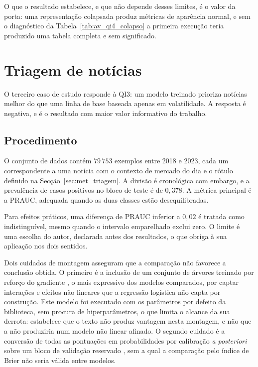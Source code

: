 O que o resultado estabelece, e que não depende desses limites, é o valor da porta: uma
representação colapsada produz métricas de aparência normal, e sem o diagnóstico da
Tabela~\ref{tab:av_qi4_colapso} a primeira execução teria produzido uma tabela completa e sem
significado.

\section{Triagem de notícias}
\label{sec:av_qi3}

O terceiro caso de estudo responde à \gls{QI}3: um modelo treinado prioriza notícias melhor do que
uma linha de base baseada apenas em volatilidade. A resposta é negativa, e é o resultado com maior
valor informativo do trabalho.

\subsection{Procedimento}

O conjunto de dados contém $79\,753$ exemplos entre 2018 e 2023, cada um correspondente a uma notícia
com o contexto de mercado do dia e o rótulo definido na Secção~\ref{sec:met_triagem}. A divisão é
cronológica com embargo, e a prevalência de casos positivos no bloco de teste é de $0{,}378$. A
métrica principal é a \gls{PRAUC}, adequada quando as duas classes estão desequilibradas.

Para efeitos práticos, uma diferença de \gls{PRAUC} inferior a $0{,}02$ é tratada como
indistinguível, mesmo quando o intervalo emparelhado exclui zero. O limite é uma escolha do autor,
declarada antes dos resultados, o que obriga à sua aplicação nos dois sentidos.

Dois cuidados de montagem asseguram que a comparação não favorece a conclusão obtida. O primeiro é a
inclusão de um conjunto de árvores treinado por reforço do gradiente \autocite{friedman2001gbm}, o
mais expressivo dos modelos comparados, por captar interações e efeitos não lineares que a regressão
logística não capta por construção. Este modelo foi executado com os parâmetros por defeito da
biblioteca, sem procura de hiperparâmetros, o que limita o alcance da sua derrota: estabelece que o
texto não produz vantagem nesta montagem, e não que a não produziria num modelo não linear afinado.
O segundo cuidado é a conversão de todas as pontuações em probabilidades por calibração \emph{a
posteriori} sobre um bloco de validação reservado \autocite{niculescu2005calibration}, sem a qual a
comparação pelo índice de Brier não seria válida entre modelos.

